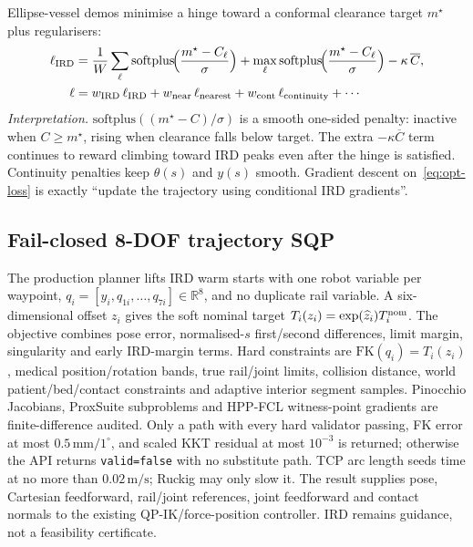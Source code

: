 \documentclass[11pt,a4paper]{article}
\begin{document}
Ellipse-vessel demos minimise a hinge toward a conformal clearance target
\(m^{\star}\) plus regularisers:
\begin{equation}
\label{eq:opt-loss}
\begin{aligned}
  \ell_{\mathrm{IRD}}
  &=
  \frac{1}{W}\sum_{\ell}
  \mathrm{softplus}\!\Bigl(\frac{m^{\star}-C_{\ell}}{\sigma}\Bigr)
  +
  \max_{\ell}\mathrm{softplus}\!\Bigl(\frac{m^{\star}-C_{\ell}}{\sigma}\Bigr)
  -
  \kappa\,\overline{C},
  \\
  \ell
  &=
  w_{\mathrm{IRD}}\,\ell_{\mathrm{IRD}}
  +
  w_{\mathrm{near}}\,\ell_{\mathrm{nearest}}
  +
  w_{\mathrm{cont}}\,\ell_{\mathrm{continuity}}
  +
  \cdots
\end{aligned}
\end{equation}
\emph{Interpretation.}
\(\mathrm{softplus}((m^{\star}-C)/\sigma)\) is a smooth one-sided penalty:
inactive when \(C\ge m^{\star}\), rising when clearance falls below target.
The extra \(-\kappa\overline{C}\) term continues to reward climbing toward
IRD peaks even after the hinge is satisfied. Continuity penalties keep
\(\theta(s)\) and \(y(s)\) smooth. Gradient descent on~\eqref{eq:opt-loss}
is exactly ``update the trajectory using conditional IRD gradients''.

\subsection{Fail-closed 8-DOF trajectory SQP}
\label{sec:trajectory-sqp}

The production planner lifts IRD warm starts with one robot variable per
waypoint, \(q_i=[y_i,q_{1i},\ldots,q_{7i}]\in\mathbb{R}^{8}\), and no duplicate
rail variable. A six-dimensional offset \(z_i\) gives the soft nominal target
\(T_i(z_i)=\exp(\widehat z_i)T_i^{\rm nom}\). The objective combines pose error,
normalised-\(s\) first/second differences, limit margin, singularity and early
IRD-margin terms. Hard constraints are \(\mathrm{FK}(q_i)=T_i(z_i)\), medical
position/rotation bands, true rail/joint limits, collision distance, world
patient/bed/contact constraints and adaptive interior segment samples.
Pinocchio Jacobians, ProxSuite subproblems and HPP-FCL witness-point gradients
are finite-difference audited. Only a path with every hard validator passing,
FK error at most \(0.5\,\mathrm{mm}/1^\circ\), and scaled KKT residual at most
\(10^{-3}\) is returned; otherwise the API returns \texttt{valid=false} with no
substitute path. TCP arc length seeds time at no more than \(0.02\,\mathrm{m/s}\);
Ruckig may only slow it. The result supplies pose, Cartesian feedforward,
rail/joint references, joint feedforward and contact normals to the existing
QP-IK/force-position controller. IRD remains guidance, not a feasibility
certificate.
\end{document}
